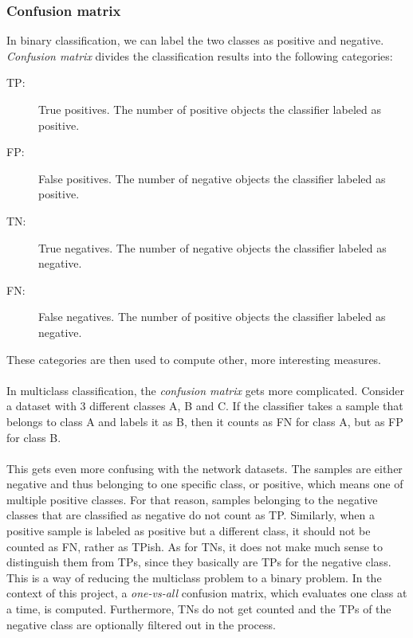 \documentclass[11pt]{article}
\begin{document}
      \subsubsection{Confusion matrix}
        In binary classification, we can label the two classes as positive and negative. {\it Confusion matrix} \cite{confusion} divides the classification results into the following categories:
        \begin{description}
        \item [TP:]   True positives. The number of positive objects the classifier labeled as positive.
        \item [FP:]   False positives. The number of negative objects the classifier labeled as positive.
        \item [TN:]   True negatives. The number of negative objects the classifier labeled as negative.
        \item [FN:]   False negatives. The number of positive objects the classifier labeled as negative.
        \end{description}
        These categories are then used to compute other, more interesting measures.
        \\~\\
        In multiclass classification, the {\it confusion matrix} gets more complicated. Consider a dataset with 3 different classes A, B and C. If the classifier takes a sample that belongs to class A and labels it as B, then it counts as FN for class A, but as FP for class B.
        \\~\\
        This gets even more confusing with the network datasets. The samples are either negative and thus belonging to one specific class, or positive, which means one of multiple positive classes. For that reason, samples belonging to the negative classes that are classified as negative do not count as TP. Similarly, when a positive sample is labeled as positive but a different class, it should not be counted as FN, rather as TPish. As for TNs, it does not make much sense to distinguish them from TPs, since they basically are TPs for the negative class. This is a way of reducing the multiclass problem to a binary problem. In the context of this project, a {\it one-vs-all} confusion matrix, which evaluates one class at a time, is computed. Furthermore, TNs do not get counted and the TPs of the negative class are optionally filtered out in the process.
\end{document}
